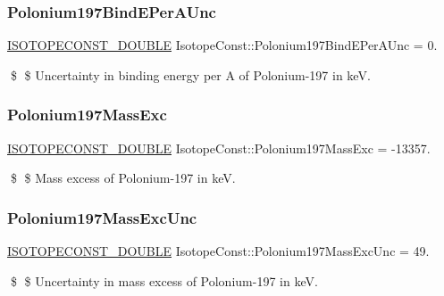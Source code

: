 \subsubsection{\texorpdfstring{Polonium197\+Bind\+E\+Per\+A\+Unc}{Polonium197BindEPerAUnc}}
{\footnotesize\ttfamily \mbox{\hyperlink{group___isotope_const-_macros_ga8f45a7272ce02c0b4c65c44636ed719a}{I\+S\+O\+T\+O\+P\+E\+C\+O\+N\+S\+T\+\_\+\+D\+O\+U\+B\+LE}} Isotope\+Const\+::\+Polonium197\+Bind\+E\+Per\+A\+Unc = 0.}

\$ \$ Uncertainty in binding energy per A of Polonium-\/197 in keV. \mbox{\label{group___isotope_const-_polonium-_po197_gaa797fffd25485da094dac333c0c48b5d}} 
\subsubsection{\texorpdfstring{Polonium197\+Mass\+Exc}{Polonium197MassExc}}
{\footnotesize\ttfamily \mbox{\hyperlink{group___isotope_const-_macros_ga8f45a7272ce02c0b4c65c44636ed719a}{I\+S\+O\+T\+O\+P\+E\+C\+O\+N\+S\+T\+\_\+\+D\+O\+U\+B\+LE}} Isotope\+Const\+::\+Polonium197\+Mass\+Exc = -\/13357.}

\$ \$ Mass excess of Polonium-\/197 in keV. \mbox{\label{group___isotope_const-_polonium-_po197_ga73ae4e97ca1327c57eec6bbf1ca27294}} 
\subsubsection{\texorpdfstring{Polonium197\+Mass\+Exc\+Unc}{Polonium197MassExcUnc}}
{\footnotesize\ttfamily \mbox{\hyperlink{group___isotope_const-_macros_ga8f45a7272ce02c0b4c65c44636ed719a}{I\+S\+O\+T\+O\+P\+E\+C\+O\+N\+S\+T\+\_\+\+D\+O\+U\+B\+LE}} Isotope\+Const\+::\+Polonium197\+Mass\+Exc\+Unc = 49.}

\$ \$ Uncertainty in mass excess of Polonium-\/197 in keV. \mbox{\label{group___isotope_const-_polonium-_po197_gac81cfe4b6ad6574e97964621268be604}} 
